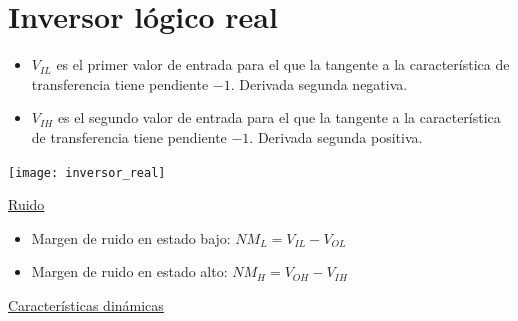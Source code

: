 \documentclass[10pt,a4paper]{article}
\begin{document}
	
	\section{Inversor lógico real}

	\begin{minipage}[t]{.45\linewidth}
		\raggedleft
		\vspace*{0pt}
		\begin{itemize}
			\item $V_{IL}$ es el primer valor de entrada para el que la tangente a la característica de transferencia tiene pendiente $-1$. Derivada segunda negativa.
			\item $V_{IH}$ es el segundo valor de entrada para el que la tangente a la característica de transferencia tiene pendiente $-1$. Derivada segunda positiva.
		\end{itemize}
	\end{minipage}%
	\begin{minipage}[t]{.45\linewidth}
		\vspace*{0pt}
		\raggedleft
		\begin{center}
			\texttt{[image: inversor\_real]}
		\end{center}
	\end{minipage}

	\underline{{\large Ruido}}
	\newline
	
	\begin{itemize}
		\item Margen de ruido en estado bajo: $\boxed{NM_L = V_{IL} - V_{OL}}$
		\item Margen de ruido en estado alto: $\boxed{NM_H = V_{OH} - V_{IH}}$
	\end{itemize} 
	\vspace{0.5cm}
	\underline{{\large Características dinámicas}}
	\newline
	
\end{document}
